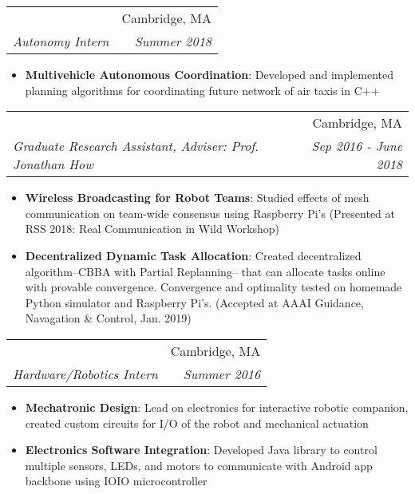 \documentclass[letterpaper,11pt]{article}
\makeatletter
\newcommand{\resumeItem}[2]{
  \item\small{
    \textbf{#1}{: #2 \vspace{-2pt}}
  }
}
\newcommand{\resumeSubheading}[4]{
  \vspace{-1pt}\item
    \begin{tabular*}{0.97\textwidth}{l@{\extracolsep{\fill}}r}
      \textbf{\color{blue}{#1}} & #2 \\
      \textit{\small#3} & \textit{\small #4} \\
    \end{tabular*}\vspace{-5pt}
}
\newcommand{\resumeItemListStart}{\begin{itemize}}
\newcommand{\resumeItemListEnd}{\end{itemize}\vspace{-5pt}}
\newcommand{\Cambridge}{Cambridge, MA}
\makeatother
\begin{document}
	\resumeSubheading
	{Aurora Flight Sciences}{\Cambridge}
	{Autonomy Intern}{Summer 2018}
	\resumeItemListStart
	\resumeItem{Multivehicle Autonomous Coordination}
	{Developed and implemented planning algorithms for coordinating future network of air taxis in C++}
   \resumeItemListEnd
   
    \resumeSubheading
      {MIT Laboratory for Information \& Decision Systems}{\Cambridge}
      {Graduate Research Assistant, \textit{Adviser: Prof. Jonathan How}}{Sep 2016 - June 2018}
      \resumeItemListStart
        \resumeItem{Wireless Broadcasting for Robot Teams}
          {Studied effects of mesh communication on team-wide consensus using Raspberry Pi's (Presented at RSS 2018:  Real Communication in Wild Workshop)}
        \resumeItem{Decentralized Dynamic Task Allocation}
          {Created decentralized algorithm--CBBA with Partial Replanning-- that can allocate tasks online with provable convergence.  Convergence and optimality tested on homemade Python simulator and Raspberry Pi's.  (Accepted at AAAI Guidance, Navagation \& Control, Jan. 2019)}
      \resumeItemListEnd

    \resumeSubheading
      {Woobo, Inc.}{\Cambridge}
      {Hardware/Robotics Intern}{Summer 2016}
      \resumeItemListStart
        \resumeItem{Mechatronic Design}
          {Lead on electronics for interactive robotic companion, created custom circuits for I/O of the robot and mechanical actuation}
        \resumeItem{Electronics Software Integration}
          {Developed Java library to control multiple sensors, LEDs, and motors to communicate with Android app backbone using IOIO microcontroller}
      \resumeItemListEnd


      
\end{document}
